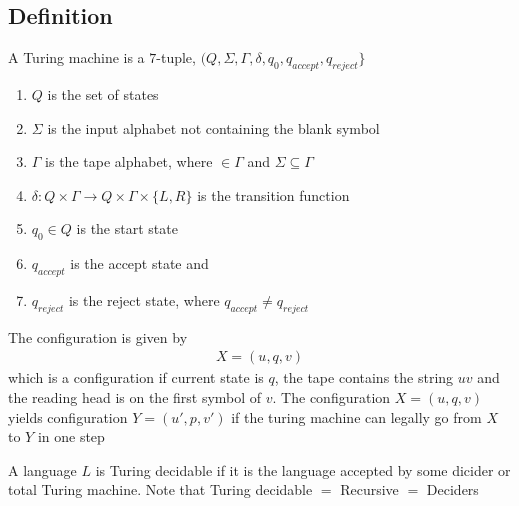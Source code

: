 \documentclass[a4paper]{article}
\theoremstyle{plain}
\theoremstyle{definition}
\newtheorem{defn}{Definition}[section]
\theoremstyle{remark}
\begin{document}
\subsection{Definition}
\begin{tcolorbox}[colback=black!3!white,colframe=black!60!white,title=\begin{defn}Turing Machine \label{Turing Machine}\end{defn}]
A Turing machine is a $7$-tuple, $(Q,\Sigma,\Gamma,\delta,q_0,q_{accept},q_{reject}\}$
\begin{enumerate}
	\item $Q$ is the set of states
	\item $\Sigma$ is the input alphabet not containing the blank symbol \textvisiblespace 
	\item $\Gamma$ is the tape alphabet, where \textvisiblespace $\in \Gamma$ and $\Sigma \subseteq \Gamma$ 
	\item $\delta : Q \times \Gamma \to Q \times \Gamma \times \{L,R\}$ is the transition function
	\item $q_0 \in Q$ is the start state
	\item $q_{accept}$ is the accept state and
	\item $q_{reject}$ is the reject state, where $q_{accept} \neq q_{reject}$
\end{enumerate}
\end{tcolorbox}
\begin{tcolorbox}[colback=black!3!white,colframe=black!60!white,title=\begin{defn}Configurations \label{Configurations}\end{defn}]
The configuration is given by
\begin{align}
X = (u,q,v)
\end{align}
which is a configuration if current state is $q$, the tape contains the string $uv$ and the reading head is on the first symbol of $v$. The configuration $X=(u,q,v)$ yields configuration $Y=(u',p,v')$ if the turing machine can legally go from $X$ to $Y$ in one step
\end{tcolorbox}
\begin{tcolorbox}[colback=black!3!white,colframe=black!60!white,title=\begin{defn}Decidability \label{Decidability}\end{defn}]
A language $L$ is Turing decidable if it is the language accepted by some dicider or total Turing machine. Note that Turing decidable $=$ Recursive $=$ Deciders
\end{tcolorbox}
\end{document}
